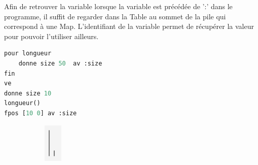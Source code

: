 \documentclass[a4paper,11pt]{article}
\begin{document}
Afin de retrouver la variable lorsque la variable est précédée de ':' dans le programme, il suffit de regarder dans la Table au sommet de la pile qui correspond à une Map. 
L'identifiant de la variable permet de récupérer la valeur pour pouvoir l'utiliser ailleurs.
\begin{lstlisting}[language=Python]
pour longueur
	donne size 50  av :size
fin
ve
donne size 10 
longueur() 
fpos [10 0] av :size
\end{lstlisting}
\begin{figure}[!h]
	\centering
	\begin{subfigure}[t]{.15\textwidth}
		\includegraphics[width=\textwidth]{img/var_figure}

\end{subfigure}
\end{figure}
\end{document}
